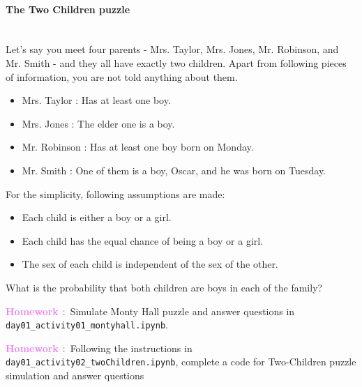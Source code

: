 \documentclass[a4paper,11pt]{exam}
\newcounter{ct}
\newcounter{homework}
\newcommand{\homework}{\stepcounter{homework}\textcolor{violet}{\textbf{Homework \thehomework:}~}}
\newcommand{\myparagraph}[1]{\paragraph{#1}\mbox{}\\}
\begin{document}
\myparagraph{The Two Children puzzle}
Let's say you meet four parents - Mrs. Taylor, Mrs. Jones, Mr. Robinson, and Mr. Smith - and they all have exactly two children. Apart from following pieces of information, you are not told anything about them.
\begin{tcolorbox}[colback=white]
	\begin{itemize}
		\item Mrs. Taylor : Has at least one boy.
		\item Mrs. Jones : The elder one is a boy.
		\item Mr. Robinson : Has at least one boy born on Monday.
		\item Mr. Smith : One of them is a boy, Oscar, and he was born on Tuesday.
	\end{itemize}
\end{tcolorbox}

For the simplicity, following assumptions are made:

\begin{itemize}
	\item Each child is either a boy or a girl.
	\item Each child has the equal chance of being a boy or a girl.
	\item The sex of each child is independent of the sex of the other.
\end{itemize}

\begin{questions}
	\question What is the probability that both children are boys in each of the family?
\end{questions}
\newpage
\homework Simulate Monty Hall puzzle and answer questions in \\ \verb|day01_activity01_montyhall.ipynb|.

\vspace{5em}

\homework Following the instructions in \verb|day01_activity02_twoChildren.ipynb|, complete a code for Two-Children puzzle simulation and answer questions
\end{document}
